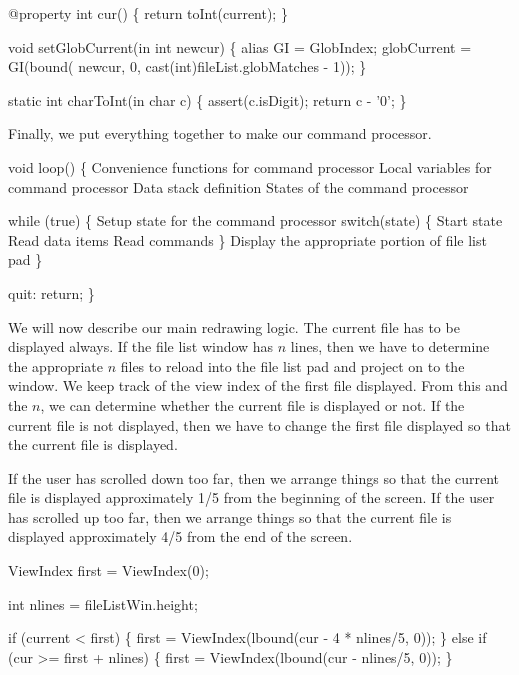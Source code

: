 @property
int cur()
\{
  return toInt(current);
\}

void setGlobCurrent(in int newcur)
\{
  alias GI = GlobIndex;
  globCurrent = GI(bound(
                 newcur,
                 0,
                 cast(int)fileList.globMatches - 1));
\}

static int charToInt(in char c)
\{
  assert(c.isDigit);
  return c - '0';
\}

\nwendcode{}Finally, we put everything together to make our command processor.

\nwenddocs{}\endmoddef\nwstartdeflinemarkup\nwenddeflinemarkup
void loop()
\{
  \LA{}Convenience functions for command processor\RA{}
  \LA{}Local variables for command processor\RA{}
  \LA{}Data stack definition\RA{}
  \LA{}States of the command processor\RA{}

  while (true) \{
    \LA{}Setup state for the command processor\RA{}
    switch(state) \{
      \LA{}Start state\RA{}
      \LA{}Read data items\RA{}
      \LA{}Read commands\RA{}
    \}
    \LA{}Display the appropriate portion of file list pad\RA{}
  \}

quit: return;
\}

\nwendcode{}We will now describe our main redrawing logic. The current file has
to be displayed always. If the file list window has $n$ lines, then we
have to determine the appropriate $n$ files to reload into the file
list pad and project on to the window. We keep track of the view index
of the first file displayed. From this and the $n$, we can determine
whether the current file is displayed or not. If the current file is
not displayed, then we have to change the first file displayed so that
the current file is displayed.

If the user has scrolled down too far, then we arrange things so that
the current file is displayed approximately 1/5 from the beginning of
the screen. If the user has scrolled up too far, then we arrange
things so that the current file is displayed approximately 4/5 from
the end of the screen.

\nwenddocs{}\plusendmoddef\nwstartdeflinemarkup\nwenddeflinemarkup
ViewIndex first = ViewIndex(0);

\nwendcode{}\endmoddef\nwstartdeflinemarkup\nwenddeflinemarkup
int nlines = fileListWin.height;

if (current < first) \{
  first = ViewIndex(lbound(cur - 4 * nlines/5, 0));
\} else if (cur >= first + nlines) \{
  first = ViewIndex(lbound(cur - nlines/5, 0));
\}


